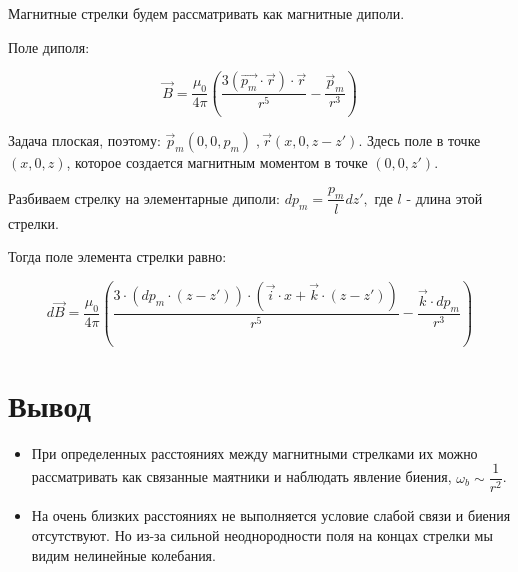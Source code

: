 \documentclass{letask}
\begin{document}
Магнитные стрелки будем рассматривать как магнитные диполи. 

Поле диполя:

$$\vec{B} = \dfrac{\mu_0}{4 \pi} \left(\dfrac{3(\vec{p_m} \cdot\vec{r}) \cdot \vec{r}}{r^5} - \dfrac{\vec p_m}{r^3}\right)$$

Задача плоская, поэтому: $\vec p_m (0, 0, p_m) \; , \vec r (x, 0, z-z')$. Здесь поле в точке $(x, 0, z)$, которое создается магнитным моментом в точке $(0,0,z')$.



Разбиваем стрелку на элементарные диполи: $dp_m = \dfrac{p_m}{l} dz',$ где $l$ - длина этой стрелки.

Тогда поле элемента стрелки равно:

\begin{equation}
d \vec{B} = \dfrac{\mu_0}{4 \pi}
	\left(
		\dfrac{3 \cdot 
			\left(dp_m \cdot (z-z') \right) 
			\cdot 
			\left( \vec{i} \cdot x + \vec{k} \cdot (z-z') \right)
		}{r^5}
	- \dfrac{\vec{k} \cdot dp_m}{r^3} 
	\right)
\end{equation}

\section{Вывод}  

\begin{itemize}
\item При определенных расстояниях между магнитными стрелками их можно рассматривать как связанные маятники и наблюдать явление биения, $\omega_b \sim \dfrac{1}{r^2}$.

\item На очень близких расстояниях не выполняется условие слабой связи и биения отсутствуют. Но из-за сильной неоднородности поля на концах стрелки мы видим нелинейные колебания.
\end{itemize}
\end{document}

